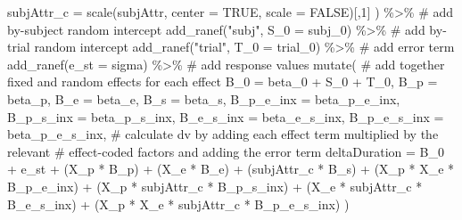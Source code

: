 \documentclass[
  letterpaper,
  DIV=11,
  numbers=noendperiod]{scrartcl}
\newenvironment{Shaded}{\begin{snugshade}}{\end{snugshade}}
\newcommand{\AttributeTok}[1]{\textcolor[rgb]{0.40,0.45,0.13}{#1}}
\newcommand{\CommentTok}[1]{\textcolor[rgb]{0.37,0.37,0.37}{#1}}
\newcommand{\ConstantTok}[1]{\textcolor[rgb]{0.56,0.35,0.01}{#1}}
\newcommand{\DecValTok}[1]{\textcolor[rgb]{0.68,0.00,0.00}{#1}}
\newcommand{\FunctionTok}[1]{\textcolor[rgb]{0.28,0.35,0.67}{#1}}
\newcommand{\NormalTok}[1]{\textcolor[rgb]{0.00,0.23,0.31}{#1}}
\newcommand{\SpecialCharTok}[1]{\textcolor[rgb]{0.37,0.37,0.37}{#1}}
\newcommand{\StringTok}[1]{\textcolor[rgb]{0.13,0.47,0.30}{#1}}
\begin{document}
\begin{Shaded}
\begin{Highlighting}[]
      \AttributeTok{subjAttr\_c =} \FunctionTok{scale}\NormalTok{(subjAttr, }\AttributeTok{center =} \ConstantTok{TRUE}\NormalTok{, }\AttributeTok{scale =} \ConstantTok{FALSE}\NormalTok{)[,}\DecValTok{1}\NormalTok{]}
\NormalTok{    ) }\SpecialCharTok{\%\textgreater{}\%} 
    \CommentTok{\# add by{-}subject random intercept}
    \FunctionTok{add\_ranef}\NormalTok{(}\StringTok{"subj"}\NormalTok{, }\AttributeTok{S\_0 =}\NormalTok{ subj\_0) }\SpecialCharTok{\%\textgreater{}\%} 
    \CommentTok{\# add by{-}trial random intercept}
    \FunctionTok{add\_ranef}\NormalTok{(}\StringTok{"trial"}\NormalTok{, }\AttributeTok{T\_0 =}\NormalTok{ trial\_0) }\SpecialCharTok{\%\textgreater{}\%} 
    \CommentTok{\# add error term}
    \FunctionTok{add\_ranef}\NormalTok{(}\AttributeTok{e\_st =}\NormalTok{ sigma) }\SpecialCharTok{\%\textgreater{}\%} 
    \CommentTok{\# add response values}
    \FunctionTok{mutate}\NormalTok{(}
      \CommentTok{\# add together fixed and random effects for each effect}
      \AttributeTok{B\_0 =}\NormalTok{ beta\_0 }\SpecialCharTok{+}\NormalTok{ S\_0 }\SpecialCharTok{+}\NormalTok{ T\_0,}
      \AttributeTok{B\_p =}\NormalTok{ beta\_p,}
      \AttributeTok{B\_e =}\NormalTok{ beta\_e,}
      \AttributeTok{B\_s =}\NormalTok{ beta\_s,}
      \AttributeTok{B\_p\_e\_inx =}\NormalTok{ beta\_p\_e\_inx,}
      \AttributeTok{B\_p\_s\_inx =}\NormalTok{ beta\_p\_s\_inx,}
      \AttributeTok{B\_e\_s\_inx =}\NormalTok{ beta\_e\_s\_inx,}
      \AttributeTok{B\_p\_e\_s\_inx =}\NormalTok{ beta\_p\_e\_s\_inx,}
      \CommentTok{\# calculate dv by adding each effect term multiplied by the relevant}
      \CommentTok{\# effect{-}coded factors and adding the error term}
      \AttributeTok{deltaDuration =} 
\NormalTok{        B\_0 }\SpecialCharTok{+}\NormalTok{ e\_st }\SpecialCharTok{+}
\NormalTok{        (X\_p }\SpecialCharTok{*}\NormalTok{ B\_p) }\SpecialCharTok{+}
\NormalTok{        (X\_e }\SpecialCharTok{*}\NormalTok{ B\_e) }\SpecialCharTok{+}
\NormalTok{        (subjAttr\_c }\SpecialCharTok{*}\NormalTok{ B\_s) }\SpecialCharTok{+}
\NormalTok{        (X\_p }\SpecialCharTok{*}\NormalTok{ X\_e }\SpecialCharTok{*}\NormalTok{ B\_p\_e\_inx) }\SpecialCharTok{+}
\NormalTok{        (X\_p }\SpecialCharTok{*}\NormalTok{ subjAttr\_c }\SpecialCharTok{*}\NormalTok{ B\_p\_s\_inx) }\SpecialCharTok{+}
\NormalTok{        (X\_e }\SpecialCharTok{*}\NormalTok{ subjAttr\_c }\SpecialCharTok{*}\NormalTok{ B\_e\_s\_inx) }\SpecialCharTok{+}
\NormalTok{        (X\_p }\SpecialCharTok{*}\NormalTok{ X\_e }\SpecialCharTok{*}\NormalTok{ subjAttr\_c }\SpecialCharTok{*}\NormalTok{ B\_p\_e\_s\_inx)}
\NormalTok{    )}
  

\end{Highlighting}
\end{Shaded}
\end{document}

